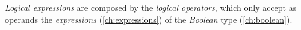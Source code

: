 \emph{Logical expressions} are composed by the \emph{logical operators},
which only accept as operands the \emph{expressions} (\ref{ch:expressions})
of the \emph{Boolean} type (\ref{ch:boolean}).
